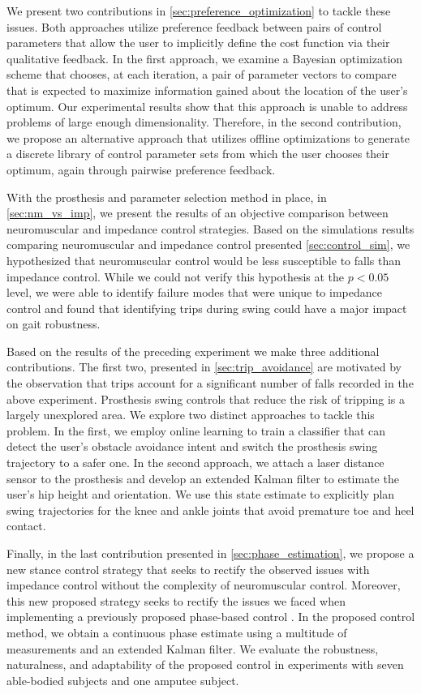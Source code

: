 We present two contributions in \cref{sec:preference_optimization} to tackle
these issues. Both approaches utilize preference feedback between pairs of
control parameters that allow the user to implicitly define the cost function
via their qualitative feedback. In the first approach, we examine a Bayesian
optimization scheme that chooses, at each iteration, a pair of parameter vectors
to compare that is expected to maximize information gained about the location of
the user's optimum. Our experimental results show that this approach is unable
to address problems of large enough dimensionality. Therefore, in the second
contribution, we propose an alternative approach that utilizes offline
optimizations to generate a discrete library of control parameter sets from
which the user chooses their optimum, again through pairwise preference
feedback.

With the prosthesis and parameter selection method in place, in
\cref{sec:nm_vs_imp}, we present the results of an objective comparison between
neuromuscular and impedance control strategies. Based on the simulations results
comparing neuromuscular and impedance control presented \cref{sec:control_sim},
we hypothesized that neuromuscular control would be less susceptible to falls
than impedance control. While we could not verify this hypothesis at the $p <
0.05$ level, we were able to identify failure modes that were unique to
impedance control and found that identifying trips during swing could have a
major impact on gait robustness.

Based on the results of the preceding experiment we make three additional
contributions. The first two, presented in \cref{sec:trip_avoidance} are
motivated by the observation that trips account for a significant number of
falls recorded in the above experiment. Prosthesis swing controls that reduce
the risk of tripping is a largely unexplored area. We explore two distinct
approaches to tackle this problem. In the first, we employ online learning to
train a classifier that can detect the user's obstacle avoidance intent and
switch the prosthesis swing trajectory to a safer one. In the second approach,
we attach a laser distance sensor to the prosthesis and develop an extended
Kalman filter to estimate the user's hip height and orientation. We use this
state estimate to explicitly plan swing trajectories for the knee and ankle
joints that avoid premature toe and heel contact.

Finally, in the last contribution presented in \cref{sec:phase_estimation}, we
propose a new stance control strategy that seeks to rectify the observed issues
with impedance control without the complexity of neuromuscular control.
Moreover, this new proposed strategy seeks to rectify the issues we faced when
implementing a previously proposed phase-based control
\citep{quintero2016preliminary}. In the proposed control method, we obtain a
continuous phase estimate using a multitude of measurements and an extended
Kalman filter. We evaluate the robustness, naturalness, and adaptability of the
proposed control in experiments with seven able-bodied subjects and one amputee
subject.
